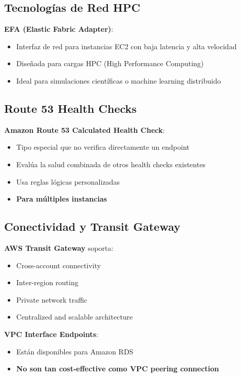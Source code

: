 \documentclass[12pt,a4paper]{report}
\newcommand{\important}[1]{\textcolor{dangerred}{\textbf{#1}}}
\begin{document}
\subsection{Tecnologías de Red HPC}

\textbf{EFA (Elastic Fabric Adapter)}:
\begin{itemize}
    \item Interfaz de red para instancias EC2 con baja latencia y alta velocidad
    \item Diseñada para cargas HPC (High Performance Computing)
    \item Ideal para simulaciones científicas o machine learning distribuido
\end{itemize}

\subsection{Route 53 Health Checks}

\textbf{Amazon Route 53 Calculated Health Check}:
\begin{itemize}
    \item Tipo especial que no verifica directamente un endpoint
    \item Evalúa la salud combinada de otros health checks existentes
    \item Usa reglas lógicas personalizadas
    \item \important{Para múltiples instancias}
\end{itemize}

\subsection{Conectividad y Transit Gateway}

\textbf{AWS Transit Gateway} soporta:
\begin{itemize}
    \item Cross-account connectivity
    \item Inter-region routing
    \item Private network traffic
    \item Centralized and scalable architecture
\end{itemize}

\textbf{VPC Interface Endpoints}:
\begin{itemize}
    \item Están disponibles para Amazon RDS
    \item \important{No son tan cost-effective como VPC peering connection}
\end{itemize}
\end{document}

